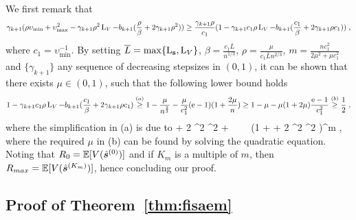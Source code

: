 \documentclass[12pt]{article}
\begin{document}
\eeq
We first remark that 
{\small
$$\gamma_{k+1}(  \rho \upsilon_{\min} +   \upsilon_{\max}^2  - \gamma_{k+1}\rho^2 \operatorname{L}_{V} - b_{k+1}(\frac{\rho}{\beta}+ 2\gamma_{k+1} \rho^2) ) \geq  \frac{\gamma_{k+1} \rho}{c_1}(1  - \gamma_{k+1}c_1\rho \operatorname{L}_{V} - b_{k+1}(\frac{c_1}{\beta}+ 2\gamma_{k+1} \rho c_1) )\;,
$$}
where $c_1 = \upsilon_{\min}^{-1}$.
By setting $\overline{L} = \max \{\operatorname{L}_{{\mathbf{s}}}, \operatorname{L}_{V} \}$, $\beta = \frac{c_1 \overline{L}}{n^{1/3}}$, $\rho = \frac{\mu}{ c_1 \overline{L}  n^{2/3}}$, $m = \frac{n c_1^2}{2 \mu^2+\mu c_1^2}$ and $\{ \gamma_{k+1}\}$ any sequence of decreasing stepsizes in $(0,1)$, it can be shown that there exists $\mu \in (0,1)$, such that the following lower bound holds
{\small
$$1  - \gamma_{k+1}c_1\rho \operatorname{L}_{V} - b_{k+1}(\frac{c_1}{\beta}+ 2\gamma_{k+1} \rho c_1)   \overset{(a)}{\geq} 1 - \frac{\mu}{ n^{\frac{2}{3}}} - \frac{ \mu }{c_1^2 } (\mathrm{e}-1) ( 1 + \frac{2 \mu}{n} )
 \geq 1 - \mu - \mu(1+2 \mu) \frac{\mathrm{e}-1}{c_1^2} \overset{(b)}{ \geq} \frac{1}{2}\;,
$$}
where the simplification in (a) is due to
\beq\notag
{} \leq \gamma \beta + 2 \gamma^2 \Lip{\bss}^2 \leq {} +  \leq {} ~~~~(1 + \gamma \beta + 2 \gamma^2 \Lip{\bss}^2 )^m \leq {} \eqs,
\eeq
where the required $\mu$ in (b) can be found by solving the quadratic equation.
Noting that $R_0 = \mathbb{E}[ V( \hat{\bm s}^{(0)} ) ]$ and if ${ K}_{ m }$ is a multiple of $m$, then $R_{ max} = \mathbb{E}[ V( \hat{\bm s}^{({ K}_{ m })}) ]$, hence concluding our proof.


\subsection{Proof of Theorem~\ref{thm:fisaem}}
\end{document}
